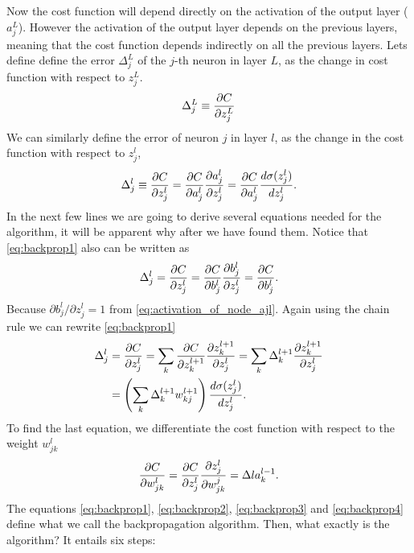 \documentclass[12pt]{extarticle}
\begin{document}
Now the cost function will depend directly on the activation of the output layer ($a^L_j$). However the activation of the output layer depends on the previous layers, meaning that the cost function depends indirectly on all the previous layers. Lets define define the error $\Delta_j^L$ of the $j$-th neuron in layer $L$, as the change in cost function with respect to $z^L_j$.
\begin{align}
	\Delta_j^L \equiv \frac{\partial C}{\partial z_j^L}
	\label{eq:backprop0}
\end{align}
We can similarly define the error of neuron $j$ in layer $l$, as the change in the cost function with respect to $z_j^l$,
\begin{align}
	\Delta_j^l \equiv \frac{\partial C}{\partial z_j^l} = \frac{\partial C}{\partial a_j^l}\frac{\partial a_j^l}{\partial z^l_j} = \frac{\partial C}{\partial a_j^l}\frac{d \sigma(z^l_j)}{d z^l_j}.
	\label{eq:backprop1}
\end{align}
In the next few lines we are going to derive several equations needed for the algorithm, it will be apparent why after we have found them. Notice that \eqref{eq:backprop1} also can be written as
\begin{align}
	\Delta_j^l = \frac{\partial C}{\partial z_j^l} = \frac{\partial C}{\partial b_j^l}\frac{\partial b_j^l}{\partial z^l_j} = \frac{\partial C}{\partial b_j^l}.
	\label{eq:backprop2}
\end{align}
Because $\partial b_j^l/\partial z^l_j = 1$ from \eqref{eq:activation_of_node_ajl}. Again using the chain rule we can rewrite \eqref{eq:backprop1}
\begin{align}
	\Delta_j^l & = \frac{\partial C}{\partial z_j^l} = \sum_{k} \frac{\partial C}{\partial z_k^{l+1}}\frac{\partial z_k^{l+1}}{\partial z^l_j} = \sum_{k} \Delta_k^{l+1}\frac{\partial z_k^{l+1}}{\partial z^l_j} \nonumber \\
	           & = \left(\sum_{k} \Delta_k^{l+1} w_{kj}^{l+1}\right)\frac{d \sigma(z^l_j)}{d z^l_j}.
	\label{eq:backprop3}
\end{align}
To find the last equation, we differentiate the cost function with respect to the weight $w^l_{jk}$
\begin{align}
	\frac{\partial C}{\partial w_{jk}^l} = \frac{\partial C}{\partial z_j^l}\frac{\partial z_j^l}{\partial w_{jk}^j} = \Delta l a_k^{l-1}.
	\label{eq:backprop4}
\end{align}
The equations \eqref{eq:backprop1}, \eqref{eq:backprop2}, \eqref{eq:backprop3} and \eqref{eq:backprop4} define what we call the backpropagation algorithm. Then, what exactly is the algorithm? It entails six steps:
\end{document}
